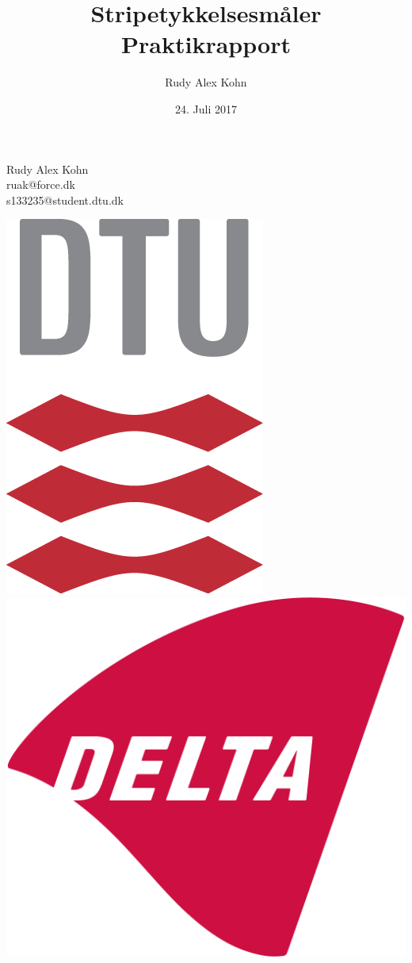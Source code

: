\documentclass[11pt,a4paper,danish]{article}
\title{Stripetykkelsesmåler\\Praktikrapport}
\author{Rudy Alex Kohn}
\date{24. Juli 2017}
\begin{document}
	
	\maketitle
	\renewcommand{\contentsname}{Indeks}
	\renewcommand{\listfigurename}{Figurliste}
	\renewcommand{\figurename}{Figur}
	\renewcommand\refname{Referencer}
	
	\begin{center}
		Rudy Alex Kohn\\
		ruak@force.dk\\
		s133235@student.dtu.dk
	\end{center}
	
	\vspace{25mm}
	
	\begin{center}
		\includegraphics[scale=0.3]{Billeder/kunlogo.png}
		\includegraphics[scale=0.15]{Billeder/DELTA_1024px.png}
	\end{center}
	
\end{document}
